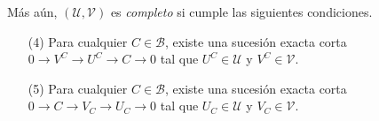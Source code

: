 \documentclass[preview]{standalone}
\begin{document}
\begin{center}
\flushleft Más aún, $(\mathcal{U}, \mathcal{V})$ es \emph{completo} si cumple las siguientes condiciones.\begin{itemize} \item[(4)] Para cualquier $C\in\mathscr{B}$, existe una sucesión exacta corta $0\to V^C\to U^C\to C\to 0$ tal que $U^C\in\mathcal{U}$ y $V^C\in\mathcal{V}$. \item[(5)] Para cualquier $C\in\mathscr{B}$, existe una sucesión exacta corta $0\to C\to V_C\to U_C\to 0$ tal que $U_C\in\mathcal{U}$ y $V_C\in\mathcal{V}$. \end{itemize}
\end{center}
\end{document}
